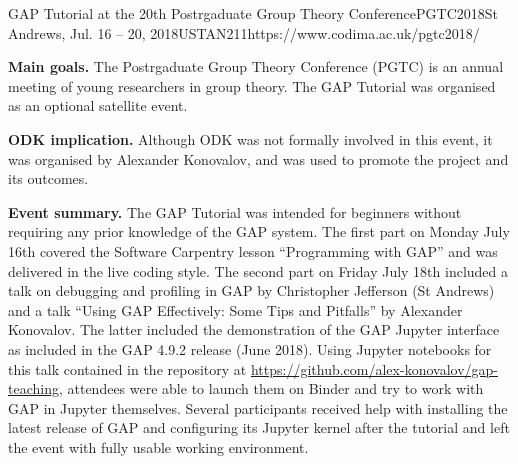 \begin{event}{GAP Tutorial at the 20th Postrgaduate Group Theory Conference}{PGTC2018}{St Andrews, Jul. 16 -- 20, 2018}{USTAN}{21}{1}{https://www.codima.ac.uk/pgtc2018/}

\textbf{Main goals.} The Postrgaduate Group Theory Conference (PGTC) is an annual meeting of
young researchers in group theory. The GAP Tutorial was organised as an optional satellite event.

\textbf{ODK implication.} Although ODK was not formally involved in this event, it was
organised by Alexander Konovalov, and was used to promote the project and its outcomes.

\textbf{Event summary.} The GAP Tutorial was intended for beginners without requiring
any prior knowledge of the GAP system. The first part on Monday July 16th covered
the Software Carpentry lesson ``Programming with GAP'' and was delivered in the live
coding style. The second part on Friday July 18th included a talk on debugging and
profiling in GAP by Christopher Jefferson (St Andrews) and a talk
``Using GAP Effectively: Some Tips and Pitfalls'' by Alexander Konovalov. The latter
included the demonstration of the GAP Jupyter interface as included in the GAP 4.9.2
release (June 2018). Using Jupyter notebooks for this talk contained in the repository
at \url{https://github.com/alex-konovalov/gap-teaching}, attendees were able to launch
them on Binder and try to work with GAP in Jupyter themselves. Several participants
received help with installing the latest release of GAP and configuring its Jupyter
kernel after the tutorial and left the event with fully usable working environment.

\end{event}